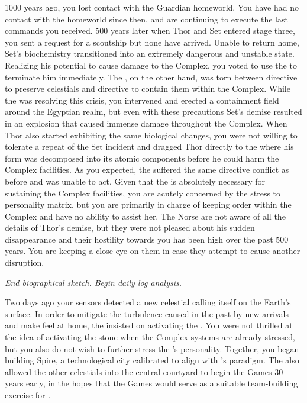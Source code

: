 \documentclass[char]{guardians}
\begin{document}
1000 years ago, you lost contact with the Guardian homeworld. You have had no contact with the homeworld since then, and are continuing to execute the last commands you received. 500 years later when Thor and Set entered stage three, you sent a request for a scoutship but none have arrived. Unable to return home, Set's biochemistry transitioned into an extremely dangerous and unstable state. Realizing his potential to cause damage to the Complex, you voted to use the \assembler{} to terminate him immediately. The \cCaretaker{}, on the other hand, was torn between \cCaretaker{\their} directive to preserve celestials and \cCaretaker{\their} directive to contain them within the Complex. While the \cCaretaker{} was resolving this crisis, you intervened and erected a containment field around the Egyptian realm, but even with these precautions Set's demise resulted in an explosion that caused immense damage throughout the Complex. When Thor also started exhibiting the same biological changes, you were not willing to tolerate a repeat of the Set incident and dragged Thor directly to the \assembler{} where his form was decomposed into its atomic components before he could harm the Complex facilities. As you expected, the \cCaretaker{} suffered the same directive conflict as before and was unable to act. Given that the \cCaretaker{} is absolutely necessary for sustaining the Complex facilities, you are acutely concerned by the stress to \cCaretaker{\their} personality matrix, but you are primarily in charge of keeping order within the Complex and have no ability to assist her. The Norse are not aware of all the details of Thor's demise, but they were not pleased about his sudden disappearance and their hostility towards you has been high over the past 500 years. You are keeping a close eye on them in case they attempt to cause another disruption.

\emph{End biographical sketch. Begin daily log analysis.}

Two days ago your sensors detected a new celestial calling itself \cUnity{} on the Earth's surface. In order to mitigate the turbulence caused in the past by new arrivals and make \cUnity{} feel at home, the \cCaretaker{} insisted on activating the \stone{}. You were not thrilled at the idea of activating the stone when the Complex systems are already stressed, but you also do not wish to further stress the \cCaretaker{}'s personality. Together, you began building Spire, a technological city calibrated to align with \cUnity{}'s paradigm. The \cCaretaker{} also allowed the other celestials into the central courtyard to begin the Games 30 years early, in the hopes that the Games would serve as a suitable team-building exercise for \cUnity{}.
\end{document}
